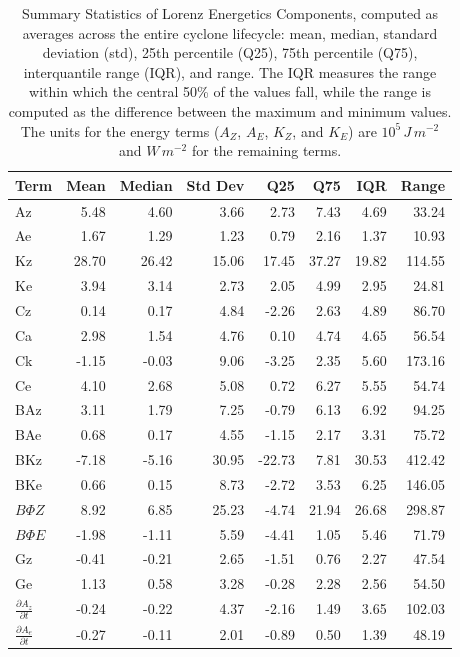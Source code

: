 \documentclass[pdflatex,sn-chicago]{sn-jnl}%
\theoremstyle{plain}
\theoremstyle{definition}
\theoremstyle{remark}
\theoremstyle{definition}
\begin{document}
\begin{table}[!htbp]
\centering
\caption[Summary Statistics of Lorenz Energetics Components]{Summary Statistics of Lorenz Energetics Components, computed as averages across the entire cyclone lifecycle: mean, median, standard deviation (std), 25th percentile (Q25), 75th percentile (Q75), interquantile range (IQR), and range. The IQR measures the range within which the central 50\% of the values fall, while the range is computed as the difference between the maximum and minimum values. The units for the energy terms ($A_Z$, $A_E$, $K_Z$, and $K_E$) are $10^5 \, J \, m^{-2}$ and $W \, m^{-2}$ for the remaining terms.}
\label{tab:lec_stats}
\begin{tabular}{lrrrrrrr}
\toprule
Term & Mean & Median & Std Dev & Q25 & Q75 & IQR & Range \\
\midrule
Az & 5.48 & 4.60 & 3.66 & 2.73 & 7.43 & 4.69 & 33.24 \\
Ae & 1.67 & 1.29 & 1.23 & 0.79 & 2.16 & 1.37 & 10.93 \\
Kz & 28.70 & 26.42 & 15.06 & 17.45 & 37.27 & 19.82 & 114.55 \\
Ke & 3.94 & 3.14 & 2.73 & 2.05 & 4.99 & 2.95 & 24.81 \\
Cz & 0.14 & 0.17 & 4.84 & -2.26 & 2.63 & 4.89 & 86.70 \\
Ca & 2.98 & 1.54 & 4.76 & 0.10 & 4.74 & 4.65 & 56.54 \\
Ck & -1.15 & -0.03 & 9.06 & -3.25 & 2.35 & 5.60 & 173.16 \\
Ce & 4.10 & 2.68 & 5.08 & 0.72 & 6.27 & 5.55 & 54.74 \\
BAz & 3.11 & 1.79 & 7.25 & -0.79 & 6.13 & 6.92 & 94.25 \\
BAe & 0.68 & 0.17 & 4.55 & -1.15 & 2.17 & 3.31 & 75.72 \\
BKz & -7.18 & -5.16 & 30.95 & -22.73 & 7.81 & 30.53 & 412.42 \\
BKe & 0.66 & 0.15 & 8.73 & -2.72 & 3.53 & 6.25 & 146.05 \\
$B\Phi Z$ & 8.92 & 6.85 & 25.23 & -4.74 & 21.94 & 26.68 & 298.87 \\
$B\Phi E$ & -1.98 & -1.11 & 5.59 & -4.41 & 1.05 & 5.46 & 71.79 \\
Gz & -0.41 & -0.21 & 2.65 & -1.51 & 0.76 & 2.27 & 47.54 \\
Ge & 1.13 & 0.58 & 3.28 & -0.28 & 2.28 & 2.56 & 54.50 \\
$\frac{\partial A_z}{\partial t}$ & -0.24 & -0.22 & 4.37 & -2.16 & 1.49 & 3.65 & 102.03 \\
$\frac{\partial A_e}{\partial t}$ & -0.27 & -0.11 & 2.01 & -0.89 & 0.50 & 1.39 & 48.19 \\

\end{tabular}
\end{table}
\end{document}
